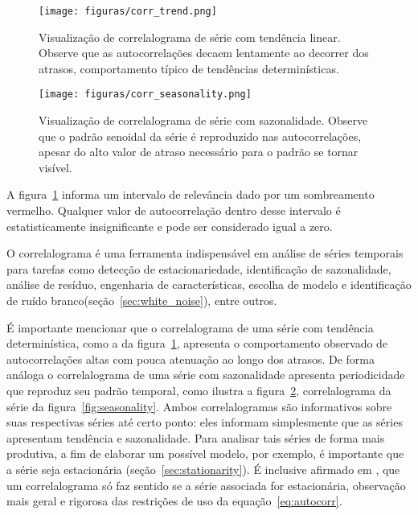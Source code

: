 \begin{figure}
    \centering
    \texttt{[image: figuras/corr\_trend.png]}
    \caption{Visualização de correlalograma de série com tendência linear.
    Observe que as autocorrelações decaem lentamente ao decorrer dos atrasos,
    comportamento típico de tendências determinísticas.}
    \label{fig:correlalogram}
\end{figure}

\begin{figure}
    \centering
    \texttt{[image: figuras/corr\_seasonality.png]}
    \caption{Visualização de correlalograma de série com sazonalidade.
    Observe que o padrão senoidal da série é reproduzido nas autocorrelações,
    apesar do alto valor de atraso necessário para o padrão se tornar visível.}
    \label{fig:corr_season}
\end{figure}

A figura~\ref{fig:correlalogram} informa um intervalo de relevância dado por um
sombreamento vermelho. Qualquer valor de autocorrelação dentro desse intervalo
é estatisticamente insignificante e pode ser considerado igual a zero.

O correlalograma é uma ferramenta indispensável em análise de séries temporais
para tarefas como detecção de estacionariedade, identificação de sazonalidade,
análise de resíduo, engenharia de características, escolha de modelo e
identificação de ruído branco(seção~\ref{sec:white_noise}), entre outros.

É importante mencionar que o correlalograma de uma série com tendência
determinística, como a da figura~\ref{fig:correlalogram}, apresenta o
comportamento observado de autocorrelações altas com pouca atenuação ao longo
dos atrasos. De forma análoga o correlalograma de uma série com sazonalidade
apresenta periodicidade que reproduz seu padrão temporal, como ilustra a
figura~\ref{fig:corr_season}, correlalograma da série da
figura~\ref{fig:seasonality}. Ambos correlalogramas são informativos sobre suas
respectivas séries até certo ponto: eles informam simplesmente que as séries
apresentam tendência e sazonalidade. Para analisar tais séries de forma mais
produtiva, a fim de elaborar um possível modelo, por exemplo, é importante que
a série seja estacionária (seção~\ref{sec:stationarity}). É inclusive afirmado
em \cite{chatfield}\cite{hamilton}\cite{box}, que um correlalograma só faz
sentido se a série associada for estacionária, observação mais geral e rigorosa
das restrições de uso da equação~\ref{eq:autocorr}.

